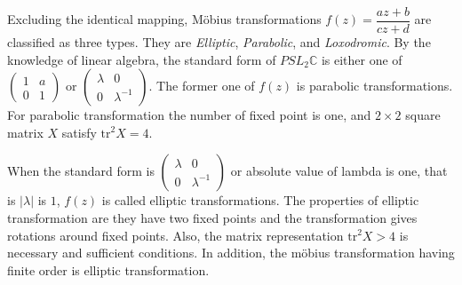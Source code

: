 Excluding the identical mapping, M\"obius transformations
$f(z) = \dfrac{az + b}{cz + d}$ are classified as three types.
They are \textit{Elliptic}, \textit{Parabolic}, and \textit{Loxodromic}.
By the knowledge of linear algebra, the standard form of $PSL_2\mathbb{C}$
is either one of $\begin{pmatrix}1 & a \\ 0 & 1 \end{pmatrix}$ or
$\begin{pmatrix}\lambda & 0 \\ 0 & \lambda^{-1} \end{pmatrix}$.
The former one of $f(z)$ is parabolic transformations.
For parabolic transformation the number of fixed point is one, and
$2 \times 2$ square matrix $X$ satisfy $\mathrm{tr}^2X = 4$.

When the standard form is
$\begin{pmatrix}\lambda & 0 \\ 0 & \lambda^{-1} \end{pmatrix}$
or absolute value of lambda is one, that is  $|\lambda|$ is $1$, 
$f(z)$ is called elliptic transformations.
The properties of elliptic transformation are they have
two fixed points and the transformation gives rotations around fixed
points.
Also, the matrix representation $\mathrm{tr}^2X > 4$ is 
necessary and sufficient conditions.
In addition, the m\"obius transformation having finite order
is elliptic transformation.

